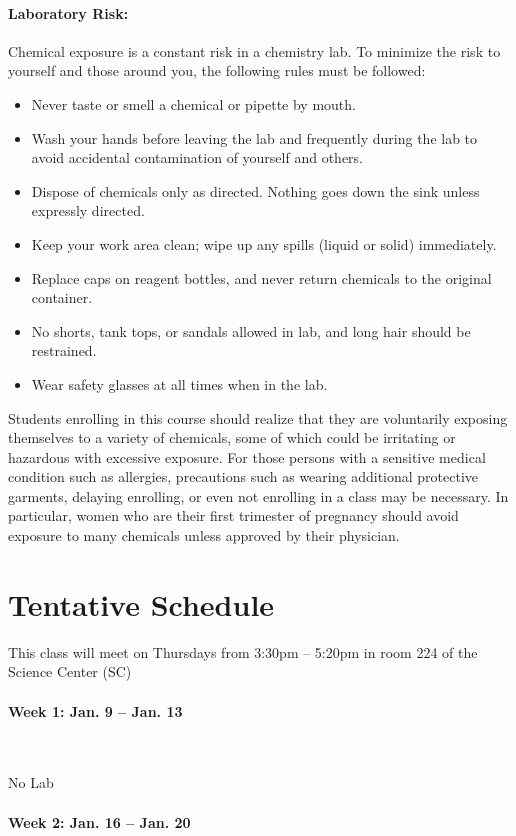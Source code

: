 \documentclass[12pt, letterpaper]{article}
\begin{document}
\paragraph{Laboratory Risk:}
Chemical exposure is a constant risk in a chemistry lab. To minimize the risk to yourself and those around you, the following rules must be followed:
\begin{itemize}
	\item Never taste or smell a chemical or pipette by mouth.
	\item Wash your hands before leaving the lab and frequently during the lab to avoid accidental contamination of yourself and others.
	\item Dispose of chemicals only as directed. Nothing goes down the sink unless expressly directed.
	\item Keep your work area clean; wipe up any spills (liquid or solid) immediately.
	\item Replace caps on reagent bottles, and never return chemicals to the original container.
	\item No shorts, tank tops, or sandals allowed in lab, and long hair should be restrained.
	\item Wear safety glasses at all times when in the lab.
\end{itemize}
Students enrolling in this course should realize that they are voluntarily exposing themselves to a variety of chemicals, some of which could be irritating or hazardous with excessive exposure.  For those persons with a sensitive medical condition such as allergies, precautions such as wearing additional protective garments, delaying enrolling, or even not enrolling in a class may be necessary.  In particular, women who are their first trimester of pregnancy should avoid exposure to many chemicals unless approved by their physician.

\section*{Tentative Schedule}
This class will meet on Thursdays from 3:30pm -- 5:20pm in room 224 of the Science Center (SC)

\paragraph{Week 1: Jan. 9 -- Jan. 13}~

No Lab

\paragraph{Week 2: Jan. 16 -- Jan. 20}~
\end{document}
